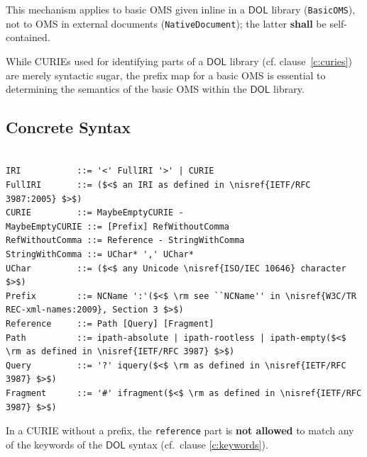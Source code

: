 \documentclass[10pt,fleqn,final]{scrreprt}
\makeatletter
\newcommand*{\cf}{cf.\@\xspace}
\newcommand*{\eg}{e.g.\@\xspace}
\newcommand*\CommentAuthor{}
\renewcommand*\CommentAuthor{#1}}
\newcommand*\CommentDate{}
\renewcommand*\CommentDate{#1}}
\newcommand*\CommentId{}
\renewcommand*\CommentId{#1}}
\newcommand*\CommentType{}
\renewcommand*\CommentType{#1}}
\newcommand*{\SetCommentColorByType}[1]{%
\edef\localType{{#1}}%
\expandafter\ifstrequal\localType{q-aut}{\colorlet{CommentColor}{red}}{%
\expandafter\ifstrequal\localType{q-all}{\colorlet{CommentColor}{orange}}{%
\expandafter\ifstrequal\localType{todo}{\colorlet{CommentColor}{orange}}{%
\expandafter\ifstrequal\localType{fyi}{\colorlet{CommentColor}{lightgray}}{%
\colorlet{CommentColor}{yellow}}}}}}
\newcommand*{\SetCommentPrefixByType}[1]{%
\edef\localType{{#1}}%
\expandafter\@ifmtarg\localType{%
\edef\CommentPrefix{}%
}{%
\caseupper[q]{#1}%
\edef\CommentPrefix{\thestring: }%
}}
\newcommand*{\initComment}[1]{%
\setkeys{Comment}{#1}%
\SetCommentColorByType{\CommentType}%
\relax%
\SetCommentPrefixByType{\CommentType}%
\relax%
}
\newcommand*{\todonote}[2][]{%
\initComment{#1}%
\pdfcomment[author=\CommentAuthor,color=CommentColor,date=\CommentDate,id=\CommentId]{%
\CommentPrefix
#2}}
\renewcommand*{\todonote}[2][]{%
\initComment{#1}%
\ednote{\CommentPrefix #2}}
\newcommand*{\syntax}[1]{\texttt{#1}}
\newcommand*{\notallowed}{\textbf{not allowed}\xspace}
\newcommand*{\shall}{\textbf{shall}\xspace}
\newcommand*{\DOL}{\ensuremath{\mathsf{DOL}}\xspace}
\newcommand{\clauserefname}{clause}
\newcommand{\cref}[1]{\clauserefname~\ref{#1}}
\newcommand{\sclause}[1]{\section{#1}}
\newcommand{\ssclause}[1]{\subsection{#1}}
\newcommand{\nisref}[1]{#1}
\newenvironment{definitions}[0]{\medskip }{}
\makeatother
\begin{document}
\begin{definitions}
This mechanism applies to basic OMS given inline in a \DOL library (\syntax{BasicOMS}), not to OMS in external documents (\syntax{NativeDocument}); the latter \shall be self-contained.

While CURIEs used for identifying parts of a \DOL library (\cf \cref{c:curies}) are merely syntactic 
sugar, the prefix map for a basic OMS is essential to determining the semantics of the basic OMS 
within the \DOL library. 




\ssclause{Concrete Syntax}\label{c:curie-syntax}

\vspace{-1.4em}
\begin{lstlisting}[language=ebnf,escapeinside={()}]

IRI           ::= '<' FullIRI '>' | CURIE
FullIRI       ::= ($<$ an IRI as defined in \nisref{IETF/RFC 3987:2005} $>$) 
CURIE         ::= MaybeEmptyCURIE -
MaybeEmptyCURIE ::= [Prefix] RefWithoutComma
RefWithoutComma ::= Reference - StringWithComma
StringWithComma ::= UChar* ',' UChar*
UChar         ::= ($<$ any Unicode \nisref{ISO/IEC 10646} character $>$) 
Prefix        ::= NCName ':'($<$ \rm see ``NCName'' in \nisref{W3C/TR REC-xml-names:2009}, Section 3 $>$)
Reference     ::= Path [Query] [Fragment]
Path          ::= ipath-absolute | ipath-rootless | ipath-empty($<$ \rm as defined in \nisref{IETF/RFC 3987} $>$)
Query         ::= '?' iquery($<$ \rm as defined in \nisref{IETF/RFC 3987} $>$)
Fragment      ::= '#' ifragment($<$ \rm as defined in \nisref{IETF/RFC 3987} $>$)
\end{lstlisting}


In a CURIE without a prefix, the \syntax{reference} part is \notallowed to match any of the keywords of the \DOL syntax (cf.\ clause \ref{c:keywords}).

\medspace










\end{definitions}
\end{document}
